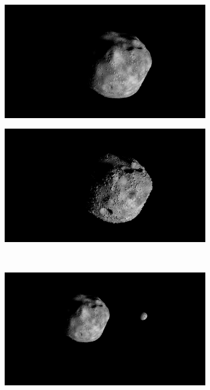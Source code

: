 \begin{figure}[htb]
    \centering
    \begin{subfigure}[b]{0.47\textwidth}
        \centering
        \includegraphics[width=\textwidth]{doc/thesis/0_figures/procedural_terrain/orig.png}
        \caption{}
        \label{fig:render_out_orig}
    \end{subfigure}
    \begin{subfigure}[b]{0.47\textwidth}
        \centering
        \includegraphics[width=\textwidth]{doc/thesis/0_figures/procedural_terrain/changed2.png}
        \caption{}
        \label{fig:render_out_changed}
    \end{subfigure}
    \\
    \begin{subfigure}[b]{0.47\textwidth}
        \centering
        \includegraphics[width=\textwidth]{doc/thesis/0_figures/procedural_terrain/main_moon.png}

\end{subfigure}
\end{figure}
